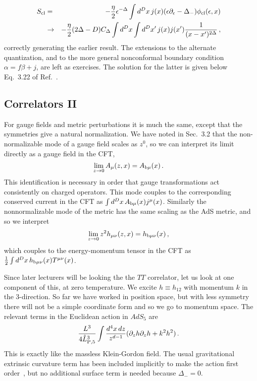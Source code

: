 \documentclass[12pt]{article}
\begin{document}
{\begin{eqnarray}
S_{\rm cl}  &=&  -\frac{\eta}{2} \epsilon^{-\Delta} \int d^Dx \,j(x) (\epsilon \partial_\epsilon - \Delta_-)\phi_{\rm cl}(\epsilon, x)   \nonumber\\
&\to&  -\frac{\eta}{2} (2\Delta - D) C_{\Delta} \int d^Dx  \int d^Dx' \,j(x) j(x') \frac{1}{ (x-x')^{2\Delta }}\,,
\end{eqnarray}
correctly generating the earlier result.  The extensions to the alternate quantization, and to the more general nonconformal boundary condition $\alpha = f\beta + j$, are left as exercises.  The solution for the latter is given below Eq.~3.22 of Ref.~\cite{Heemskerk:2010hk}.

\subsection{Correlators II}

For gauge fields and metric perturbations it is much the same, except that the symmetries give a natural normalization.  We have noted in Sec.~3.2 that the non-normalizable mode of a gauge field scales as $z^0$, so we can interpret its limit directly as a gauge field in the CFT,
\begin{equation}
\lim_{z\to 0} A_\mu(z,x) = A_{\rm b\mu}(x) \,.
\end{equation}
This identification is necessary in order that gauge transformations act consistently on charged operators.
This mode couples to the corresponding conserved current in the CFT as $\int d^Dx\, A_{\rm b\mu}(x) j^\mu(x)$.  Similarly the nonnormalizable mode of the metric has the same scaling as the AdS metric, and so we interpret
\begin{equation}
\lim_{z\to 0} z^2 h_{\mu\nu}(z,x) = h_{\rm b\mu\nu}(x) \,, 
\end{equation}
which couples to the energy-momentum tensor in the CFT as $\frac{1}{2} \int d^Dx\, h_{\rm b\mu\nu}(x) T^{\mu\nu}(x)$.  

Since later lecturers will be looking the the $TT$ correlator, let us look at one component of this, at zero temperature.  We excite $h \equiv h_{12}$ with momentum $k$ in the 3-direction.  So far we have worked in position space, but with less symmetry there will not be a simple coordinate form and so we go to momentum space.  The relevant terms in the Euclidean action in $AdS_5$ are
\begin{equation}
\frac{L^3}{4 \hat L_{{\rm P},5}^{3}} \int \frac{ d^4x\,dz}{z^{d-1}} (\partial_z h \partial_z h + k^2 h^2) \,.
\end{equation}
This is exactly like the massless Klein-Gordon field.  The usual gravitational extrinsic curvature term has been included implicitly to make the action first order~\cite{Gibbons:1976ue}, but no additional surface term is needed because $\Delta_- = 0$.

}
\end{document}

